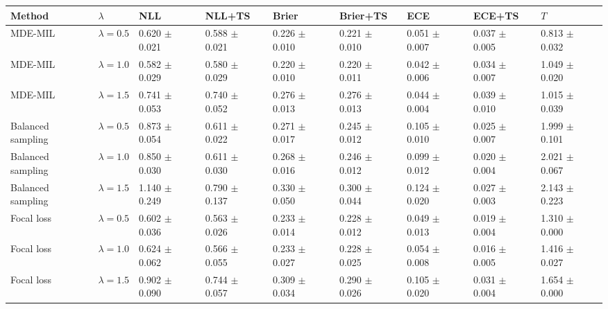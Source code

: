 \begin{tabular}{lllllllll}
\toprule
Method & $\lambda$ & NLL & NLL+TS & Brier & Brier+TS & ECE & ECE+TS & $T$\\
\midrule
MDE-MIL & $\lambda=0.5$ & \num{0.620} $\pm$ \num{0.021} & \num{0.588} $\pm$ \num{0.021} & \num{0.226} $\pm$ \num{0.010} & \num{0.221} $\pm$ \num{0.010} & \num{0.051} $\pm$ \num{0.007} & \num{0.037} $\pm$ \num{0.005} & \num{0.813} $\pm$ \num{0.032}\\
MDE-MIL & $\lambda=1.0$ & \num{0.582} $\pm$ \num{0.029} & \num{0.580} $\pm$ \num{0.029} & \num{0.220} $\pm$ \num{0.010} & \num{0.220} $\pm$ \num{0.011} & \num{0.042} $\pm$ \num{0.006} & \num{0.034} $\pm$ \num{0.007} & \num{1.049} $\pm$ \num{0.020}\\
MDE-MIL & $\lambda=1.5$ & \num{0.741} $\pm$ \num{0.053} & \num{0.740} $\pm$ \num{0.052} & \num{0.276} $\pm$ \num{0.013} & \num{0.276} $\pm$ \num{0.013} & \num{0.044} $\pm$ \num{0.004} & \num{0.039} $\pm$ \num{0.010} & \num{1.015} $\pm$ \num{0.039}\\
Balanced sampling & $\lambda=0.5$ & \num{0.873} $\pm$ \num{0.054} & \num{0.611} $\pm$ \num{0.022} & \num{0.271} $\pm$ \num{0.017} & \num{0.245} $\pm$ \num{0.012} & \num{0.105} $\pm$ \num{0.010} & \num{0.025} $\pm$ \num{0.007} & \num{1.999} $\pm$ \num{0.101}\\
Balanced sampling & $\lambda=1.0$ & \num{0.850} $\pm$ \num{0.030} & \num{0.611} $\pm$ \num{0.030} & \num{0.268} $\pm$ \num{0.016} & \num{0.246} $\pm$ \num{0.012} & \num{0.099} $\pm$ \num{0.012} & \num{0.020} $\pm$ \num{0.004} & \num{2.021} $\pm$ \num{0.067}\\
Balanced sampling & $\lambda=1.5$ & \num{1.140} $\pm$ \num{0.249} & \num{0.790} $\pm$ \num{0.137} & \num{0.330} $\pm$ \num{0.050} & \num{0.300} $\pm$ \num{0.044} & \num{0.124} $\pm$ \num{0.020} & \num{0.027} $\pm$ \num{0.003} & \num{2.143} $\pm$ \num{0.223}\\
Focal loss & $\lambda=0.5$ & \num{0.602} $\pm$ \num{0.036} & \num{0.563} $\pm$ \num{0.026} & \num{0.233} $\pm$ \num{0.014} & \num{0.228} $\pm$ \num{0.012} & \num{0.049} $\pm$ \num{0.013} & \num{0.019} $\pm$ \num{0.004} & \num{1.310} $\pm$ \num{0.000}\\
Focal loss & $\lambda=1.0$ & \num{0.624} $\pm$ \num{0.062} & \num{0.566} $\pm$ \num{0.055} & \num{0.233} $\pm$ \num{0.027} & \num{0.228} $\pm$ \num{0.025} & \num{0.054} $\pm$ \num{0.008} & \num{0.016} $\pm$ \num{0.005} & \num{1.416} $\pm$ \num{0.027}\\
Focal loss & $\lambda=1.5$ & \num{0.902} $\pm$ \num{0.090} & \num{0.744} $\pm$ \num{0.057} & \num{0.309} $\pm$ \num{0.034} & \num{0.290} $\pm$ \num{0.026} & \num{0.105} $\pm$ \num{0.020} & \num{0.031} $\pm$ \num{0.004} & \num{1.654} $\pm$ \num{0.000}\\

\end{tabular}
